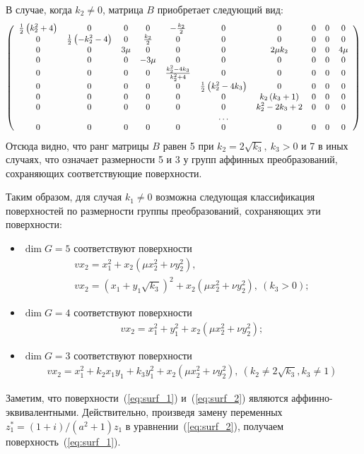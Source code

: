 \documentclass[../main.tex]{subfiles}
\begin{document}
В случае, когда $k_2 \ne 0$, матрица $B$ приобретает следующий вид:
\begin{equation*}
{\small\left(
\begin{array}{cccccccccc}
 \frac{1}{2} \left(k_2^2+4\right) & 0 & 0 & 0 & -\frac{k_2}{2} & 0 & 0 & 0 & 0 & 0 \\
 0 & \frac{1}{2} \left(-k_2^2-4\right) & 0 & \frac{k_2}{2} & 0 & 0 & 0 & 0 & 0 & 0 \\
 0 & 0 & 3 \mu  & 0 & 0 & 0 & 2 \mu  k_2 & 0 & 0 & 4 \mu  \\
 0 & 0 & 0 & -3 \mu  & 0 & 0 & 0 & 0 & 0 & 0 \\
 0 & 0 & 0 & 0 & \frac{k_2^2 - 4 k_3}{k_2^2+4} & 0 & 0 & 0 & 0 & 0 \\
 0 & 0 & 0 & 0 & 0 & \frac{1}{2} \left(k_2^2-4 k_3\right) & 0 & 0 & 0 & 0 \\
 0 & 0 & 0 & 0 & 0 & 0 & k_2 \left(k_3+1\right) & 0 & 0 & 0 \\
 0 & 0 & 0 & 0 & 0 & 0 & k_2^2-2 k_3+2 & 0 & 0 & 0 \\
   &   &   &   &   & \hdots &   &   &   &   \\
 0 & 0 & 0 & 0 & 0 & 0 & 0 & 0 & 0 & 0 \\
\end{array}
\right)}
\end{equation*}
Отсюда видно, что ранг матрицы $B$ равен 5 при $k_2 = 2\sqrt{k_3},~k_3 > 0$ и 7 в иных случаях, что означает размерности 5 и 3 у групп аффинных преобразований, сохраняющих соответствующие поверхности.

Таким образом, для случая $k_1 \ne 0$ возможна следующая классификация поверхностей по размерности группы преобразований, сохраняющих эти поверхности:
\begin{itemize}
\item $\dim G = 5$ соответствуют поверхности
\begin{gather}
	v x_2 = x_1^2 + x_2 (\mu x_2^2 + \nu y_2^2),\label{eq:surf_1} \\
	v x_2 = (x_1 + y_1 \sqrt{k_3})^2 + x_2 (\mu x_2^2 + \nu y_2^2),~(k_3 > 0);\label{eq:surf_2}
\end{gather}
\item $\dim G = 4$ соответствуют поверхности
\begin{gather}
	v x_2 = x_1^2 + y_1^2 + x_2 (\mu x_2^2 + \nu y_2^2);
\end{gather}
\item $\dim G = 3$ соответствуют поверхности
\begin{gather}
	v x_2 = x_1^2 + k_2 x_1 y_1 + k_3 y_1^2 + x_2 (\mu x_2^2 + \nu y_2^2),~(k_2 \ne 2\sqrt{k_3}, k_3 \ne 1)
\end{gather}
\end{itemize}
Заметим, что поверхности~(\ref{eq:surf_1}) и~(\ref{eq:surf_2}) являются аффинно-эквивалентными. Действительно, произведя замену переменных $z^*_1 = (1+i)/(a^2+1)z_1$ в уравнении~(\ref{eq:surf_2}), получаем поверхность~(\ref{eq:surf_1}).
\end{document}
